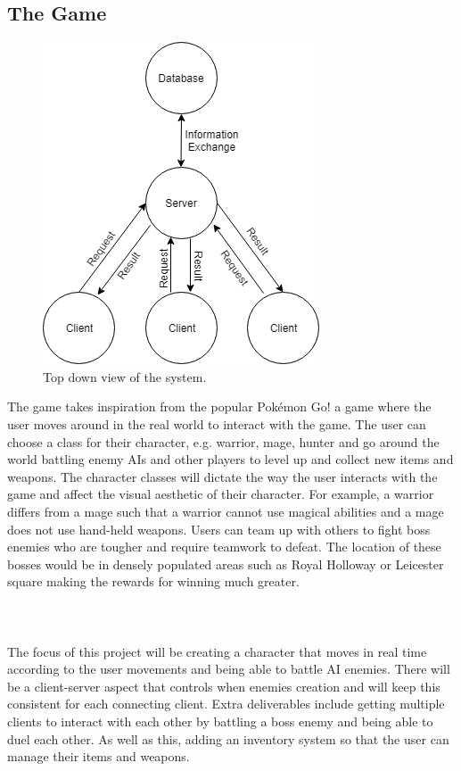 \documentclass[a4paper]{report}
\begin{document}
\subsection{The Game}
\begin{figure}
\caption{Top down view of the system.}
\label{wrap-fig:1}
\includegraphics[scale=0.5]{"System Design"}
\end{figure} 
The game takes inspiration from the popular Pokémon Go! a game where the user moves around in the real world to interact with the game. The user can choose a class for their character, e.g. warrior, mage, hunter and go around the world battling enemy AIs and other players to level up and collect new items and weapons. The character classes will dictate the way the user interacts with the game and affect the visual aesthetic of their character. For example, a warrior differs from a mage such that a warrior cannot use magical abilities and a mage does not use hand-held weapons. Users can team up with others to fight boss enemies who are tougher and require teamwork to defeat. The location of these bosses would be in densely populated areas such as Royal Holloway or Leicester square making the rewards for winning much greater.
\\\\
\pagebreak
\\\\
The focus of this project will be creating a character that moves in real time according to the user movements and being able to battle AI enemies. There will be a client-server aspect that controls when enemies creation and will keep this consistent for each connecting client. Extra deliverables include getting multiple clients to interact with each other by battling a boss enemy and being able to duel each other. As well as this, adding an inventory system so that the user can manage their items and weapons.
\end{document}
